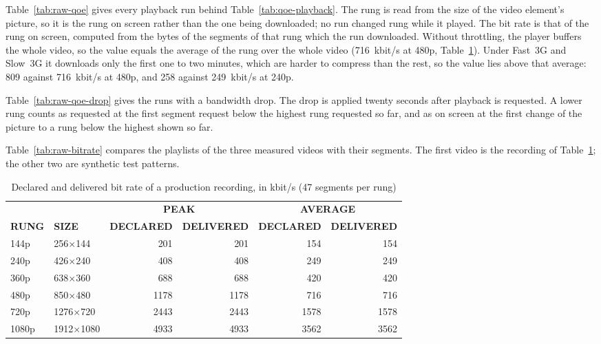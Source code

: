 Table~\ref{tab:raw-qoe} gives every playback run behind Table~\ref{tab:qoe-playback}. The rung is
read from the size of the video element's picture, so it is the rung on screen rather than the one
being downloaded; no run changed rung while it played. The bit rate is that of the rung on screen,
computed from the bytes of the segments of that rung which the run downloaded. Without throttling,
the player buffers the whole video, so the value equals the average of the rung over the whole
video (716~kbit/s at 480p, Table~\ref{tab:bitrate-check}). Under Fast~3G and Slow~3G it downloads
only the first one to two minutes, which are harder to compress than the rest, so the value lies
above that average: 809 against 716~kbit/s at 480p, and 258 against 249~kbit/s at 240p.



Table~\ref{tab:raw-qoe-drop} gives the runs with a bandwidth drop. The drop is applied twenty seconds
after playback is requested. A lower rung counts as requested at the first segment request below the
highest rung requested so far, and as on screen at the first change of the picture to a rung below
the highest shown so far.



Table~\ref{tab:raw-bitrate} compares the playlists of the three measured videos with their segments.
The first video is the recording of Table~\ref{tab:bitrate-check}; the other two are synthetic test
patterns.



\begin{table}[H]
\centering
\caption{Declared and delivered bit rate of a production recording, in kbit/s (47 segments per rung)}
\label{tab:bitrate-check}
\small
\begin{tabular}{l l r r r r}
\toprule
 & & \multicolumn{2}{c}{\textbf{PEAK}} & \multicolumn{2}{c}{\textbf{AVERAGE}} \\
\cmidrule(lr){3-4} \cmidrule(lr){5-6}
\textbf{RUNG} & \textbf{SIZE} & \textbf{DECLARED} & \textbf{DELIVERED} & \textbf{DECLARED} & \textbf{DELIVERED} \\
\midrule
144p  & 256$\times$144   & 201  & 201  & 154  & 154 \\
240p  & 426$\times$240   & 408  & 408  & 249  & 249 \\
360p  & 638$\times$360   & 688  & 688  & 420  & 420 \\
480p  & 850$\times$480   & 1178 & 1178 & 716  & 716 \\
720p  & 1276$\times$720  & 2443 & 2443 & 1578 & 1578 \\
1080p & 1912$\times$1080 & 4933 & 4933 & 3562 & 3562 \\
\bottomrule
\end{tabular}
\end{table}

